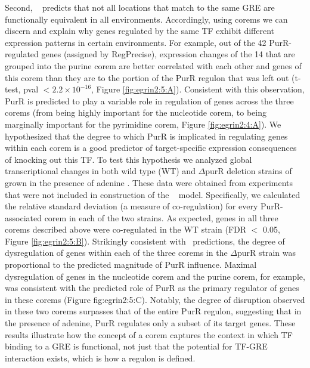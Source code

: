 

Second, \egrine~ predicts that not all locations that match to the same GRE are functionally equivalent in all environments. Accordingly, using corems we can discern and explain why genes regulated by the same TF exhibit different expression patterns in certain environments. For example, out of the 42 PurR-regulated genes (assigned by RegPrecise), expression changes of the 14 that are grouped into the purine corem are better correlated with each other and genes of this corem than they are to the portion of the PurR regulon that was left out (t-test, pval $< 2.2\times10^{-16}$, Figure \ref{fig:egrin2:5:A}). Consistent with this observation, PurR is predicted to play a variable role in regulation of genes across the three corems (from being highly important for the nucleotide corem, to being marginally important for the pyrimidine corem, Figure \ref{fig:egrin2:4:A}). We hypothesized that the degree to which PurR is implicated in regulating genes within each corem is a good predictor of target-specific expression consequences of knocking out this TF. To test this hypothesis we analyzed global transcriptional changes in both wild type (WT) and $\Delta$purR deletion strains of \eco grown in the presence of adenine \cite{cho_purr_2011}. These data were obtained from experiments that were not included in construction of the \egrine~ model. Specifically, we calculated the relative standard deviation (a measure of co-regulation) for every PurR-associated corem in each of the two strains. As expected, genes in all three corems described above were co-regulated in the WT strain (FDR $<$ 0.05, Figure \ref{fig:egrin2:5:B}). Strikingly consistent with \egrine~predictions, the degree of dysregulation of genes within each of the three corems in the $\Delta$purR strain was proportional to the predicted magnitude of PurR influence. Maximal dysregulation of genes in the nucleotide corem and the purine corem, for example, was consistent with the predicted role of PurR as the primary regulator of genes in these corems (Figure fig:egrin2:5:C). Notably, the degree of disruption observed in these two corems surpasses that of the entire PurR regulon, suggesting that in the presence of adenine, PurR regulates only a subset of its target genes. These results illustrate how the concept of a corem captures the context in which TF binding to a GRE is functional, not just that the potential for TF-GRE interaction exists, which is how a regulon is defined.

